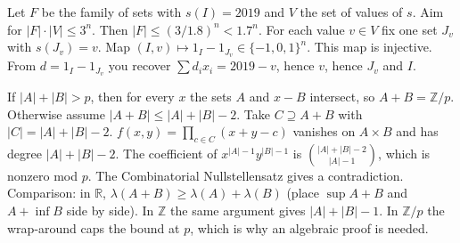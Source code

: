 \documentclass[11pt,a4paper]{article}
\begin{document}
Let \(F\) be the family of sets with \(s(I)=2019\) and \(V\) the set of values of \(s\). Aim for \(|F|\cdot|V|\le3^n\). Then \(|F|\le(3/1.8)^n<1.7^n\).
For each value \(v\in V\) fix one set \(J_v\) with \(s(J_v)=v\). Map \((I,v)\mapsto1_I-1_{J_v}\in\{-1,0,1\}^n\).
This map is injective. From \(d=1_I-1_{J_v}\) you recover \(\sum d_ix_i=2019-v\), hence \(v\), hence \(J_v\) and \(I\).

If \(|A|+|B|>p\), then for every \(x\) the sets \(A\) and \(x-B\) intersect, so \(A+B=\mathbb Z/p\). Otherwise assume \(|A+B|\le|A|+|B|-2\). Take \(C\supseteq A+B\) with \(|C|=|A|+|B|-2\).
\(f(x,y)=\prod_{c\in C}(x+y-c)\) vanishes on \(A\times B\) and has degree \(|A|+|B|-2\). The coefficient of \(x^{|A|-1}y^{|B|-1}\) is \(\binom{|A|+|B|-2}{|A|-1}\), which is nonzero mod \(p\). The Combinatorial Nullstellensatz gives a contradiction.
Comparison: in \(\mathbb R\), \(\lambda(A+B)\ge\lambda(A)+\lambda(B)\) (place \(\sup A+B\) and \(A+\inf B\) side by side). In \(\mathbb Z\) the same argument gives \(|A|+|B|-1\). In \(\mathbb Z/p\) the wrap-around caps the bound at \(p\), which is why an algebraic proof is needed.
\end{document}
